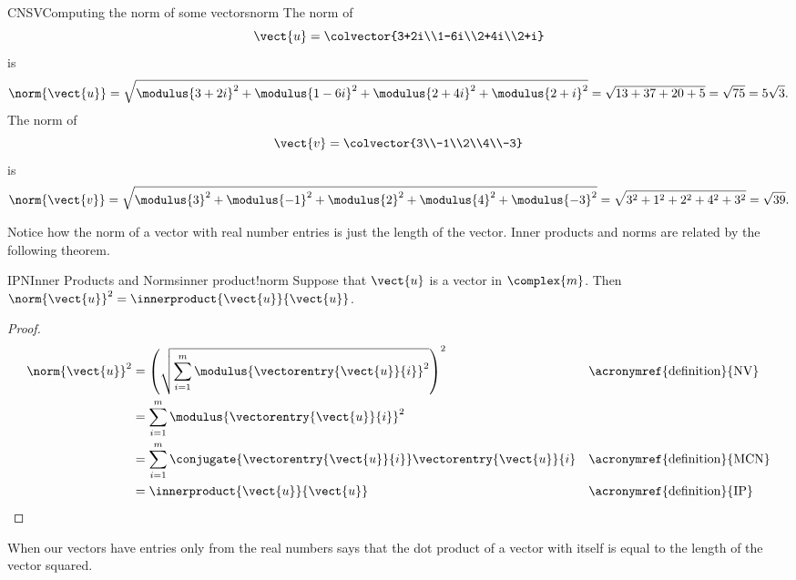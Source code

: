 \begin{example}{CNSV}{Computing the norm of some vectors}{norm}
The norm of
%
\begin{equation*}
\vect{u}=\colvector{3+2i\\1-6i\\2+4i\\2+i}
\end{equation*}
%
is
%
\begin{equation*}
\norm{\vect{u}}=
\sqrt{\modulus{3+2i}^2+\modulus{1-6i}^2+\modulus{2+4i}^2+\modulus{2+i}^2}
=\sqrt{13+37+20+5}=\sqrt{75}=5\sqrt{3}.
\end{equation*}
%
The norm of
%
\begin{equation*}
\vect{v}=\colvector{3\\-1\\2\\4\\-3}
\end{equation*}
%
is
%
\begin{equation*}
\norm{\vect{v}}=
\sqrt{\modulus{3}^2+\modulus{-1}^2+\modulus{2}^2+\modulus{4}^2+\modulus{-3}^2}
=\sqrt{3^2+1^2+2^2+4^2+3^2}=\sqrt{39}.
\end{equation*}
%
\end{example}
%
Notice how the norm of a vector with real number entries is just the length of the vector.  Inner products and norms are related by the following theorem.\par
%
\begin{theorem}{IPN}{Inner Products and Norms}{inner product!norm}
Suppose that $\vect{u}$ is a vector in $\complex{m}$.  Then
$\norm{\vect{u}}^2=\innerproduct{\vect{u}}{\vect{u}}$.
\end{theorem}
%
\begin{proof}
\begin{align*}
\norm{\vect{u}}^2
&=\left(\sqrt{\sum_{i=1}^{m}\modulus{\vectorentry{\vect{u}}{i}}^2}\right)^2
&&\text{\acronymref{definition}{NV}}\\
%
&=\sum_{i=1}^{m}\modulus{\vectorentry{\vect{u}}{i}}^2\\
%
&=\sum_{i=1}^{m}\conjugate{\vectorentry{\vect{u}}{i}}\vectorentry{\vect{u}}{i}
&&\text{\acronymref{definition}{MCN}}\\
%
&=\innerproduct{\vect{u}}{\vect{u}}
&&\text{\acronymref{definition}{IP}}
%
\end{align*}
\end{proof}
%
When our vectors have entries only from the real numbers  says that the dot product of a vector with itself is equal to the length of the vector squared.
